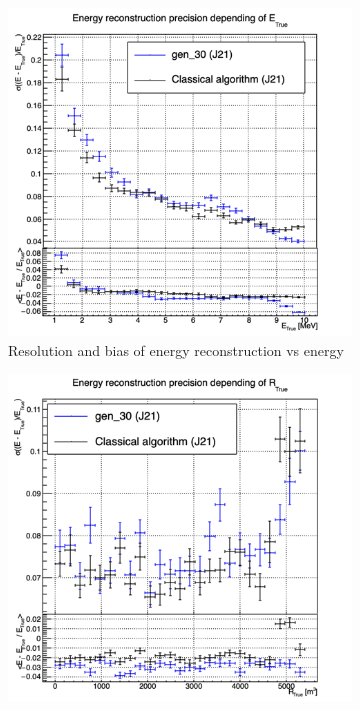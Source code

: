 \documentclass[../main.tex]{subfiles}
\begin{document}
{{\begin{figure}[ht]
  \centering
  \begin{subfigure}[t]{0.32\linewidth}
    \centering
    \includegraphics[width=\linewidth]{images/jcnn/vic_cnn/multi_vic_cnn_MESBvETC.png}
    \caption{Resolution and bias of energy reconstruction vs energy}
    \label{fig:jcnn:vic_cnn:multi_vic_cnn_MESBvETC}
  \end{subfigure}
  \begin{subfigure}[t]{0.32\linewidth}
    \centering
    \includegraphics[width=\linewidth]{images/jcnn/vic_cnn/multi_vic_cnn_MESBvRTC.png}

\end{subfigure}
\end{figure}}}
\end{document}
